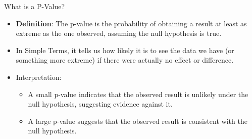 \documentclass[
  ignorenonframetext,
]{beamer}
\providecommand{\tightlist}{%
  \setlength{\itemsep}{0pt}\setlength{\parskip}{0pt}}
\begin{document}
\begin{frame}{What is a P-Value?}
\label{what-is-a-p-value}
\begin{itemize}
\tightlist
\item
  \textbf{Definition}: The p-value is the probability of obtaining a
  result at least as extreme as the one observed, assuming the null
  hypothesis is true.
\end{itemize}

\begin{itemize}
\tightlist
\item
  In Simple Terms, it tells us how likely it is to see the data we have
  (or something more extreme) if there were actually no effect or
  difference.
\end{itemize}

\begin{itemize}
\item
  Interpretation:

  \begin{itemize}
  \tightlist
  \item
    A small p-value indicates that the observed result is unlikely under
    the null hypothesis, suggesting evidence against it.\\
  \item
    A large p-value suggests that the observed result is consistent with
    the null hypothesis.
  \end{itemize}
\end{itemize}
\end{frame}
\end{document}
